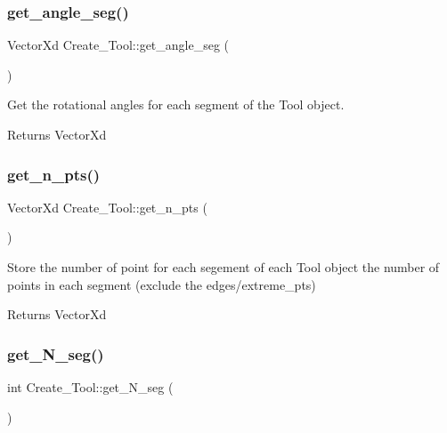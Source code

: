 \subsubsection{\texorpdfstring{get\+\_\+angle\+\_\+seg()}{get\_angle\_seg()}}
{\footnotesize\ttfamily Vector\+Xd Create\+\_\+\+Tool\+::get\+\_\+angle\+\_\+seg (\begin{DoxyParamCaption}{ }\end{DoxyParamCaption})\hspace{0.3cm}{\ttfamily [inline]}}



Get the rotational angles for each segment of the \textquotesingle{}Tool\textquotesingle{} object. 

\begin{DoxyReturn}{Returns}
Vector\+Xd 
\end{DoxyReturn}
\mbox{\label{classCreate__Tool_a0a76e83b7d85e64bb0c9aa8306a0b0f6}} 
\subsubsection{\texorpdfstring{get\+\_\+n\+\_\+pts()}{get\_n\_pts()}}
{\footnotesize\ttfamily Vector\+Xd Create\+\_\+\+Tool\+::get\+\_\+n\+\_\+pts (\begin{DoxyParamCaption}{ }\end{DoxyParamCaption})}



Store the number of point for each segement of each \textquotesingle{}Tool\textquotesingle{} object the number of points in each segment (exclude the edges/extreme\+\_\+pts) 

\begin{DoxyReturn}{Returns}
Vector\+Xd 
\end{DoxyReturn}
\mbox{\label{classCreate__Tool_a1140f90d5c44110f44939e564646a316}} 
\subsubsection{\texorpdfstring{get\+\_\+\+N\+\_\+seg()}{get\_N\_seg()}}
{\footnotesize\ttfamily int Create\+\_\+\+Tool\+::get\+\_\+\+N\+\_\+seg (\begin{DoxyParamCaption}{ }\end{DoxyParamCaption})\hspace{0.3cm}{\ttfamily [inline]}}



